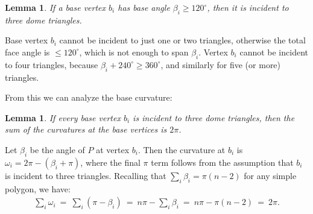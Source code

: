 \documentclass[11pt]{article}
\newcommand{\hide}[1]{}
\newcommand{\ABox}{
\raisebox{3pt}{\framebox[6pt]{\rule{6pt}{0pt}}}
}
\newenvironment{proof}{{\bf Proof:}}{\hfill\ABox\medskip}
\newtheorem{lemma}[theorem]{Lemma}
\newcommand{\lemlab}[1]{\label{lemma:#1}}
\def\b{{\beta}}
\def\o{{\omega}}
\newcommand{\JOR}[1]{{\color{red} JOR: [#1]}}
\newcommand{\Anna}[1]{{\color{red} Anna: [#1]}}
\newcommand{\anna}[1]{{\color{blue} #1}}
\begin{document}
\begin{lemma}
\lemlab{3Triangles}
\label{lem:3Triangles}
If a 
base vertex  $b_i$ has base angle 
$\b_i \ge 120^\circ$,
then it is incident to three dome triangles. %
\end{lemma}
\begin{proof}
Base vertex $b_i$ cannot 
be incident to just one
or two triangles, otherwise the total face angle is $\le 120^\circ$, which
is not enough to span $\b_i$.
Vertex $b_i$ cannot
be incident to four triangles,
because 
$\b_i + 240^\circ \ge 360^\circ$,
and similarly for 
five (or more) triangles.
%
\end{proof}

From this we can analyze the base curvature:

\begin{lemma} 
\lemlab{BaseCurv}
If every base vertex $b_i$ is incident to three dome triangles,
then the sum of the curvatures at the base vertices is $2\pi$.
\end{lemma}
\begin{proof}
Let $\b_i$ be the angle of $P$ at vertex $b_i$.
Then the curvature at $b_i$ is $\o_i = 2 \pi - (\b_i + \pi)$, where the final $\pi$ term follows from
the assumption that $b_i$ is incident to three triangles.
Recalling that $\sum_i \b_i = \pi(n-2)$ for any simple polygon,
we have:
\begin{align*}
\sum_i \o_i  \ = \ \sum_i (\pi - \b_i) 
\ = \  n \pi - \sum_i \b_i 
 \ = \  n \pi - \pi (n-2) 
 \ = \  2 \pi.
\end{align*}
\end{proof}
\end{document}
